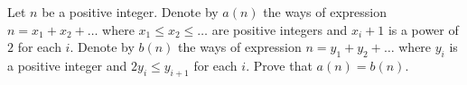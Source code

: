 Let $n$ be a positive integer. Denote by $a(n)$ the ways of expression $n=x_1+x_2+\dots$ where $x_1\leqslant x_2 \leqslant\dots$ are positive integers and $x_i+1$ is a power of $2$ for each $i$. Denote by $b(n)$ the ways of expression $n=y_1+y_2+\dots$ where $y_i$ is a positive integer and $2y_i\leqslant y_{i+1}$ for each $i$.
Prove that $a(n)=b(n)$.